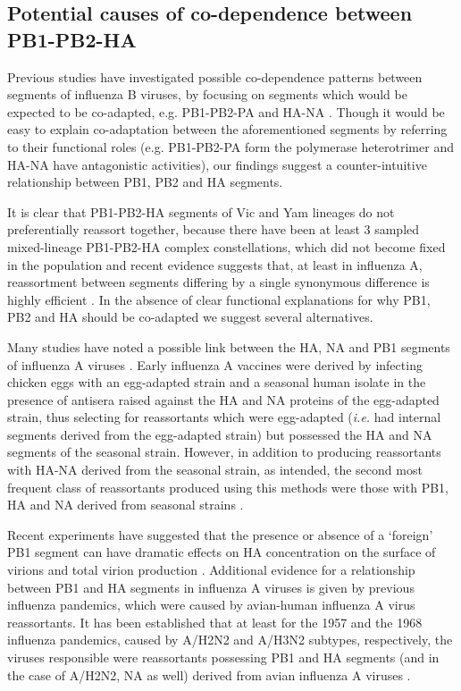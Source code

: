 \documentclass[11pt,oneside,letterpaper]{article}
\begin{document}
\subsection*{Potential causes of co-dependence between PB1-PB2-HA}
Previous studies have investigated possible co-dependence patterns between segments of influenza B viruses, by focusing on segments which would be expected to be co-adapted, e.g. PB1-PB2-PA and HA-NA \cite{mccullers2004}.
Though it would be easy to explain co-adaptation between the aforementioned segments by referring to their functional roles (e.g. PB1-PB2-PA form the polymerase heterotrimer and HA-NA have antagonistic activities), our findings suggest a counter-intuitive relationship between PB1, PB2 and HA segments.

It is clear that PB1-PB2-HA segments of Vic and Yam lineages do not preferentially reassort together, because there have been at least 3 sampled mixed-lineage PB1-PB2-HA complex constellations, which did not become fixed in the population and recent evidence suggests that, at least in influenza A, reassortment between segments differing by a single synonymous difference is highly efficient \cite{marshall2013}.
In the absence of clear functional explanations for why PB1, PB2 and HA should be co-adapted we suggest several alternatives.

Many studies have noted a possible link between the HA, NA and PB1 segments of influenza A viruses \cite{bergeron2010,fulvini2011}.
Early influenza A vaccines were derived by infecting chicken eggs with an egg-adapted strain and a seasonal human isolate in the presence of antisera raised against the HA and NA proteins of the egg-adapted strain, thus selecting for reassortants which were egg-adapted (\textit{i.e.} had internal segments derived from the egg-adapted strain) but possessed the HA and NA segments of the seasonal strain.
However, in addition to producing reassortants with HA-NA derived from the seasonal strain, as intended, the second most frequent class of reassortants produced using this methods were those with PB1, HA and NA derived from seasonal strains \cite{bergeron2010,fulvini2011}.

Recent experiments have suggested that the presence or absence of a `foreign' PB1 segment can have dramatic effects on HA concentration on the surface of virions and total virion production \cite{cobbin2013}.
Additional evidence for a relationship between PB1 and HA segments in influenza A viruses is given by previous influenza pandemics, which were caused by avian-human influenza A virus reassortants.
It has been established that at least for the 1957 and the 1968 influenza pandemics, caused by A/H2N2 and A/H3N2 subtypes, respectively, the viruses responsible were reassortants possessing PB1 and HA segments (and in the case of A/H2N2, NA as well) derived from avian influenza A viruses \cite{kawaoka1989}.
\end{document}
